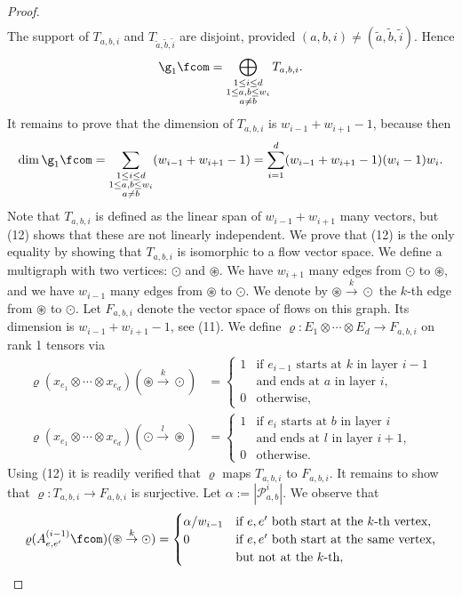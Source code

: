 \begin{proof}
\begin{align*}
\end{align*}
The support of $T_{a,b,i}$ and $T_{\widetilde a,\widetilde b,\widetilde i}$ are disjoint, provided $(a,b,i)\ne(\widetilde a,\widetilde b,\widetilde i)$. Hence
\[\g_1\fcom=\bigoplus_{\substack{1\le i\le d\\1\le a,b\le w_i\\a\ne b}}T_{a,b,i}.\]
It remains to prove that the dimension of $T_{a,b,i}$ is $w_{i-1}+w_{i+1}-1$, because then
\[\dim\g_1\fcom=\sum_{\substack{1\le i\le d\\1\le a,b\le w_i\\a\ne b}}(w_{i-1}+w_{i+1}-1)=\sum_{i=1}^d(w_{i-1}+w_{i+1}-1)(w_i-1)w_i.\]
Note that $T_{a,b,i}$ is defined as the linear span of $w_{i-1}+w_{i+1}$ many vectors, but (12) shows that these are not linearly independent. We prove that (12) is the only equality by showing that $T_{a,b,i}$ is isomorphic to a flow vector space. We define a multigraph with two vertices: $\odot$ and $\circledast$. We have $w_{i+1}$ many edges from $\odot$ to $\circledast$, and we have $w_{i-1}$ many edges from $\circledast$ to $\odot$. We denote by $\circledast\overset k\to\odot$ the $k$-th edge from $\circledast$ to $\odot$. Let $F_{a,b,i}$ denote the vector space of flows on this graph. Its dimension is $w_{i-1}+w_{i+1}-1$, see (11). We define $\varrho:E_1\otimes\cdots\otimes E_d\to F_{a,b,i}$ on rank 1 tensors via
\begin{align*}
\varrho(x_{e_1}\otimes\cdots\otimes x_{e_d})(\circledast\overset k\to\odot)&=\begin{cases}1&\text{if }e_{i-1}\text{ starts at }k\text{ in layer }i-1\\&\text{and ends at }a\text{ in layer }i,\\0&\text{otherwise},\end{cases}\\
\varrho(x_{e_1}\otimes\cdots\otimes x_{e_d})(\odot\overset l\to\circledast)&=\begin{cases}1&\text{if }e_i\text{ starts at }b\text{ in layer }i\\&\text{and ends at }l\text{ in layer }i+1,\\0&\text{otherwise}.\end{cases}
\end{align*}
Using (12) it is readily verified that $\varrho$ maps $T_{a,b,i}$ to $F_{a,b,i}$. It remains to show that $\varrho:T_{a,b,i}\to F_{a,b,i}$ is surjective. Let $\alpha:=|\mathcal P^i_{a,b}|$. We observe that
\begin{align*}
\varrho(A^{(i-1)}_{e,e'}\fcom)(\circledast\overset k\to\odot)&=\begin{cases}\alpha/w_{i-1}&\text{if }e,e'\text{ both start at the }k\text{-th vertex},\\0&\text{if }e,e'\text{ both start at the same vertex,}\\&\text{but not at the }k\text{-th},\end{cases}\\

\end{align*}
\end{proof}
